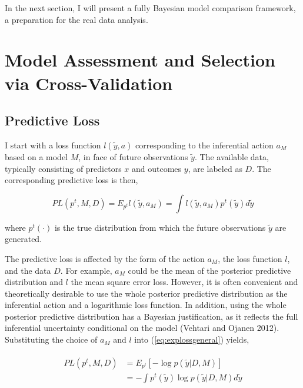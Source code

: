 In the next section, I will present a fully Bayesian model comparison
framework, a preparation for the real data analysis.

\section{Model Assessment and Selection via
Cross-Validation}\label{model-assessment-and-selection-via-cross-validation}

\subsection{Predictive Loss}\label{predictive-loss}

I start with a loss function \(l(\tilde y, a)\) corresponding to the
inferential action \(a_M\) based on a model \(M\), in face of future
observations \(\tilde y\). The available data, typically consisting of
predictors \(x\) and outcomes \(y\), are labeled as \(D\). The
corresponding predictive loss is then,

\begin{equation}
\label{eq:explossgeneral}
PL(p^t, M, D)=E_{p^t}l(\tilde y,
a_M)=\int l(\tilde y, a_M) p^t(\tilde y)d\tilde y
\end{equation}

\noindent where \(p^t(\cdot)\) is the true distribution from which the
future observations \(\tilde y\) are generated.

The predictive loss is affected by the form of the action \(a_M\), the
loss function \(l\), and the data \(D\). For example, \(a_M\) could be
the mean of the posterior predictive distribution and \(l\) the mean
square error loss. However, it is often convenient and theoretically
desirable to use the whole posterior predictive distribution as the
inferential action and a logarithmic loss function. In addition, using
the whole posterior predictive distribution has a Bayesian
justification, as it reflects the full inferential uncertainty
conditional on the model (Vehtari and Ojanen 2012). Substituting the
choice of \(a_M\) and \(l\) into (\ref{eq:explossgeneral}) yields,

\begin{align}
  \begin{split}
  \label{eq:logloss}
  PL(p^t, M, D)&=E_{p^t}[-\log p(\tilde y|D, M)]\\ 
  &=-\int p^t(\tilde y) \log p(\tilde y|D, M) d\tilde y
  \end{split}
  \end{align}

